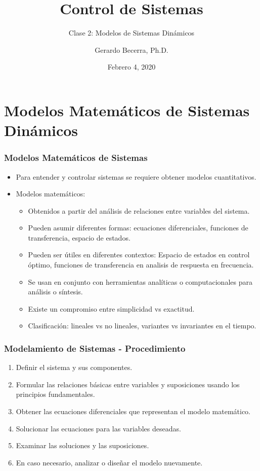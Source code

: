 \documentclass[aspectratio=169,handout]{beamer}
\title{Control de Sistemas}
\subtitle{\small Clase 2: Modelos de Sistemas Dinámicos}
\author{Gerardo Becerra, Ph.D.}
\institute{Pontificia Universidad Javeriana\\ Departamento de Electrónica}
\date{Febrero 4, 2020}
\theoremstyle{definition}
\theoremstyle{plain}
\theoremstyle{remark}
\begin{document}
\frame{\titlepage}	


\section{Modelos Matemáticos de Sistemas Dinámicos}
\begin{frame}[<+->]\frametitle{Modelos Matemáticos de Sistemas}
\begin{itemize}
  \item Para entender y controlar sistemas se requiere obtener modelos cuantitativos.
  \item Modelos matemáticos:
  \begin{itemize}
    \item Obtenidos a partir del análisis de relaciones entre variables del sistema.
    \item Pueden asumir diferentes formas: ecuaciones diferenciales, funciones de transferencia, espacio de estados.
    \item Pueden ser útiles en diferentes contextos: Espacio de estados en control óptimo, funciones de transferencia en analisis de respuesta en frecuencia.
    \item Se usan en conjunto con herramientas analíticas o computacionales para análisis o síntesis.
    \item Existe un compromiso entre simplicidad vs exactitud.
    \item Clasificación: lineales vs no lineales, variantes vs invariantes en el tiempo.
  \end{itemize} 
\end{itemize}
\end{frame}

\begin{frame}[<+->]\frametitle{Modelamiento de Sistemas - Procedimiento}
\begin{enumerate}
  \item Definir el sistema y sus componentes.
  \item Formular las relaciones básicas entre variables y suposiciones usando los principios fundamentales.
  \item Obtener las ecuaciones diferenciales que representan el modelo matemático.
  \item Solucionar las ecuaciones para las variables deseadas.
  \item Examinar las soluciones y las suposiciones.
  \item En caso necesario, analizar o diseñar el modelo nuevamente.
\end{enumerate}
\end{frame}
\end{document}

